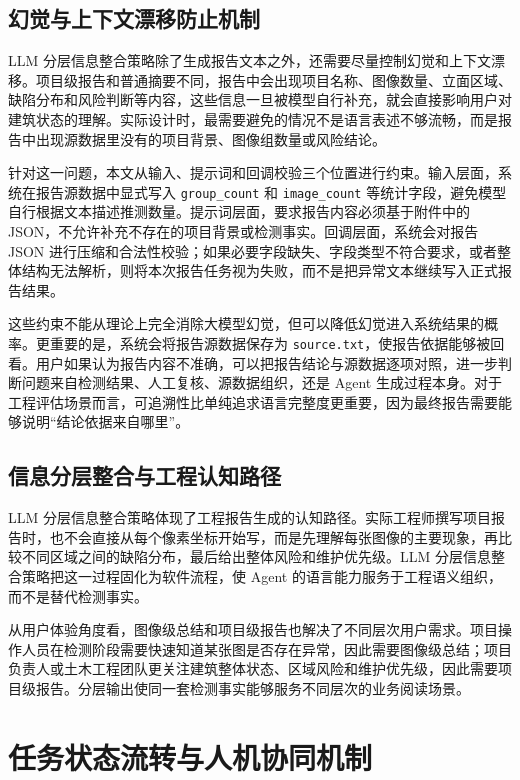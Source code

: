 \subsection{幻觉与上下文漂移防止机制}
\label{subsec:design-llm-hallucination-control}

LLM 分层信息整合策略除了生成报告文本之外，还需要尽量控制幻觉和上下文漂移。项目级报告和普通摘要不同，报告中会出现项目名称、图像数量、立面区域、缺陷分布和风险判断等内容，这些信息一旦被模型自行补充，就会直接影响用户对建筑状态的理解。实际设计时，最需要避免的情况不是语言表述不够流畅，而是报告中出现源数据里没有的项目背景、图像组数量或风险结论。

针对这一问题，本文从输入、提示词和回调校验三个位置进行约束。输入层面，系统在报告源数据中显式写入 \texttt{group\_count} 和 \texttt{image\_count} 等统计字段，避免模型自行根据文本描述推测数量。提示词层面，要求报告内容必须基于附件中的 JSON，不允许补充不存在的项目背景或检测事实。回调层面，系统会对报告 JSON 进行压缩和合法性校验；如果必要字段缺失、字段类型不符合要求，或者整体结构无法解析，则将本次报告任务视为失败，而不是把异常文本继续写入正式报告结果。

这些约束不能从理论上完全消除大模型幻觉，但可以降低幻觉进入系统结果的概率。更重要的是，系统会将报告源数据保存为 \texttt{source.txt}，使报告依据能够被回看。用户如果认为报告内容不准确，可以把报告结论与源数据逐项对照，进一步判断问题来自检测结果、人工复核、源数据组织，还是 Agent 生成过程本身。对于工程评估场景而言，可追溯性比单纯追求语言完整度更重要，因为最终报告需要能够说明“结论依据来自哪里”。

\subsection{信息分层整合与工程认知路径}
\label{subsec:design-engineering-cognition-path}

LLM 分层信息整合策略体现了工程报告生成的认知路径。实际工程师撰写项目报告时，也不会直接从每个像素坐标开始写，而是先理解每张图像的主要现象，再比较不同区域之间的缺陷分布，最后给出整体风险和维护优先级。LLM 分层信息整合策略把这一过程固化为软件流程，使 Agent 的语言能力服务于工程语义组织，而不是替代检测事实。

从用户体验角度看，图像级总结和项目级报告也解决了不同层次用户需求。项目操作人员在检测阶段需要快速知道某张图是否存在异常，因此需要图像级总结；项目负责人或土木工程团队更关注建筑整体状态、区域风险和维护优先级，因此需要项目级报告。分层输出使同一套检测事实能够服务不同层次的业务阅读场景。

\section{任务状态流转与人机协同机制}
\label{sec:design-detection-task-state-transition}


